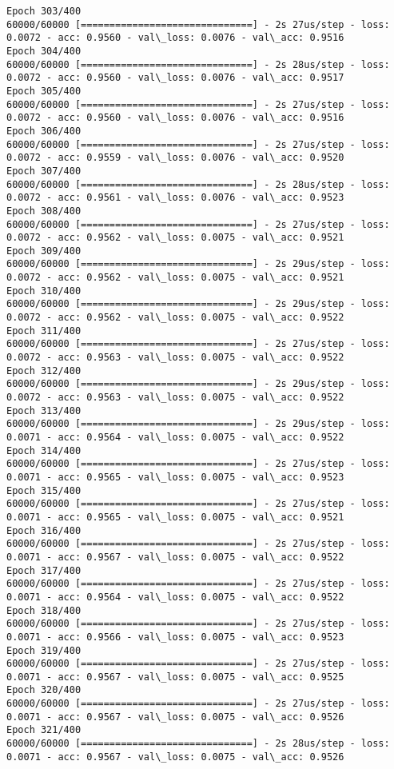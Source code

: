 \documentclass[11pt]{article}
\begin{document}
\begin{Verbatim}[commandchars=\\\{\}]
Epoch 303/400
60000/60000 [==============================] - 2s 27us/step - loss: 0.0072 - acc: 0.9560 - val\_loss: 0.0076 - val\_acc: 0.9516
Epoch 304/400
60000/60000 [==============================] - 2s 28us/step - loss: 0.0072 - acc: 0.9560 - val\_loss: 0.0076 - val\_acc: 0.9517
Epoch 305/400
60000/60000 [==============================] - 2s 27us/step - loss: 0.0072 - acc: 0.9560 - val\_loss: 0.0076 - val\_acc: 0.9516
Epoch 306/400
60000/60000 [==============================] - 2s 27us/step - loss: 0.0072 - acc: 0.9559 - val\_loss: 0.0076 - val\_acc: 0.9520
Epoch 307/400
60000/60000 [==============================] - 2s 28us/step - loss: 0.0072 - acc: 0.9561 - val\_loss: 0.0076 - val\_acc: 0.9523
Epoch 308/400
60000/60000 [==============================] - 2s 27us/step - loss: 0.0072 - acc: 0.9562 - val\_loss: 0.0075 - val\_acc: 0.9521
Epoch 309/400
60000/60000 [==============================] - 2s 29us/step - loss: 0.0072 - acc: 0.9562 - val\_loss: 0.0075 - val\_acc: 0.9521
Epoch 310/400
60000/60000 [==============================] - 2s 29us/step - loss: 0.0072 - acc: 0.9562 - val\_loss: 0.0075 - val\_acc: 0.9522
Epoch 311/400
60000/60000 [==============================] - 2s 27us/step - loss: 0.0072 - acc: 0.9563 - val\_loss: 0.0075 - val\_acc: 0.9522
Epoch 312/400
60000/60000 [==============================] - 2s 29us/step - loss: 0.0072 - acc: 0.9563 - val\_loss: 0.0075 - val\_acc: 0.9522
Epoch 313/400
60000/60000 [==============================] - 2s 29us/step - loss: 0.0071 - acc: 0.9564 - val\_loss: 0.0075 - val\_acc: 0.9522
Epoch 314/400
60000/60000 [==============================] - 2s 27us/step - loss: 0.0071 - acc: 0.9565 - val\_loss: 0.0075 - val\_acc: 0.9523
Epoch 315/400
60000/60000 [==============================] - 2s 27us/step - loss: 0.0071 - acc: 0.9565 - val\_loss: 0.0075 - val\_acc: 0.9521
Epoch 316/400
60000/60000 [==============================] - 2s 27us/step - loss: 0.0071 - acc: 0.9567 - val\_loss: 0.0075 - val\_acc: 0.9522
Epoch 317/400
60000/60000 [==============================] - 2s 27us/step - loss: 0.0071 - acc: 0.9564 - val\_loss: 0.0075 - val\_acc: 0.9522
Epoch 318/400
60000/60000 [==============================] - 2s 27us/step - loss: 0.0071 - acc: 0.9566 - val\_loss: 0.0075 - val\_acc: 0.9523
Epoch 319/400
60000/60000 [==============================] - 2s 27us/step - loss: 0.0071 - acc: 0.9567 - val\_loss: 0.0075 - val\_acc: 0.9525
Epoch 320/400
60000/60000 [==============================] - 2s 27us/step - loss: 0.0071 - acc: 0.9567 - val\_loss: 0.0075 - val\_acc: 0.9526
Epoch 321/400
60000/60000 [==============================] - 2s 28us/step - loss: 0.0071 - acc: 0.9567 - val\_loss: 0.0075 - val\_acc: 0.9526

\end{Verbatim}
\end{document}
